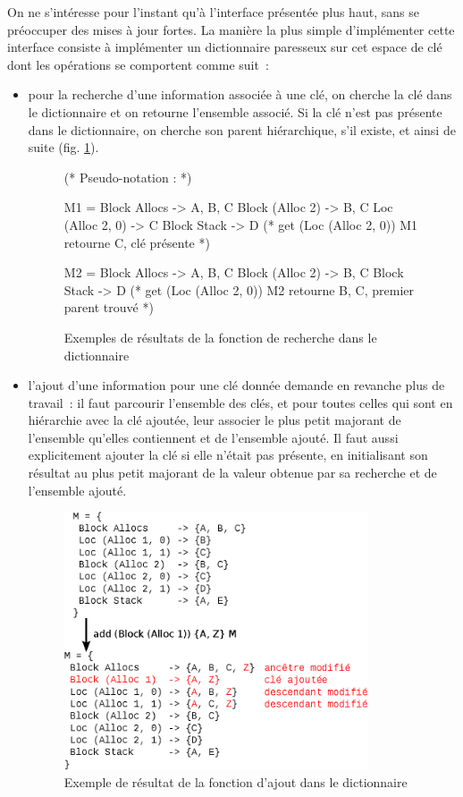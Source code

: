 \documentclass{article}
\begin{document}
On ne s'intéresse pour l'instant qu'à l'interface présentée plus haut, sans se
préoccuper des mises à jour fortes. La manière la plus simple d'implémenter
cette interface consiste à implémenter un dictionnaire paresseux sur cet espace
de clé dont les opérations se comportent comme suit~:

\begin{itemize}

\item pour la recherche d'une information associée à une clé, on cherche la clé
dans le dictionnaire et on retourne l'ensemble associé. Si la clé n'est pas
présente dans le dictionnaire, on cherche son parent hiérarchique, s'il existe,
et ainsi de suite (fig. \ref{get}).

\begin{figure}[htb]
\begin{coq}
(* Pseudo-notation : *)

M1 = { Block Allocs     -> {A, B, C}
       Block (Alloc 2)  -> {B, C}
       Loc (Alloc 2, 0) -> {C}
       Block Stack      -> {D} }
(* get (Loc (Alloc 2, 0)) M1 retourne {C}, clé présente *)

M2 = { Block Allocs    -> {A, B, C}
       Block (Alloc 2) -> {B, C}
       Block Stack     -> {D} }
(* get (Loc (Alloc 2, 0)) M2 retourne {B, C}, premier parent trouvé *)
\end{coq}
\caption{Exemples de résultats de la fonction de recherche dans le dictionnaire}
\label{get}
\end{figure}

\item l'ajout d'une information pour une clé donnée demande en revanche plus de
travail~: il faut parcourir l'ensemble des clés, et pour toutes celles qui sont
en hiérarchie avec la clé ajoutée, leur associer le plus petit majorant de
l'ensemble qu'elles contiennent et de l'ensemble ajouté. Il faut aussi
explicitement ajouter la clé si elle n'était pas présente, en initialisant son
résultat au plus petit majorant de la valeur obtenue par sa recherche et de
l'ensemble ajouté.

\begin{figure}[ht]
\begin{center}
  \includegraphics[width=9cm]{add.eps}
\end{center}
\caption{Exemple de résultat de la fonction d'ajout dans le dictionnaire}
\label{add}
\end{figure}

\end{itemize}
\end{document}
